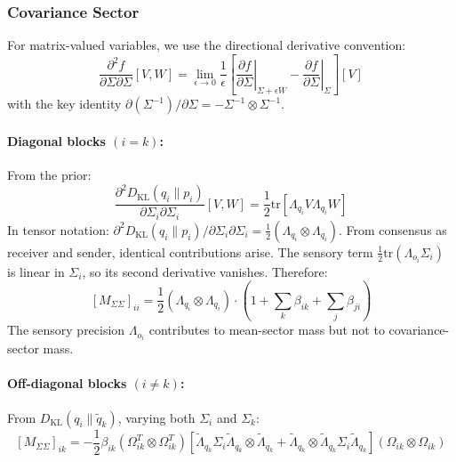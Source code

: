 \documentclass[11pt]{article}
\begin{document}
\subsubsection{Covariance Sector}

For matrix-valued variables, we use the directional derivative convention:
\begin{equation}
\frac{\partial^2 f}{\partial \Sigma \partial \Sigma}[V, W] = \lim_{\epsilon \to 0} \frac{1}{\epsilon}\left[\left.\frac{\partial f}{\partial \Sigma}\right|_{\Sigma + \epsilon W} - \left.\frac{\partial f}{\partial \Sigma}\right|_{\Sigma}\right][V]
\end{equation}
with the key identity $\partial(\Sigma^{-1})/\partial \Sigma = -\Sigma^{-1} \otimes \Sigma^{-1}$.

\paragraph{Diagonal blocks $(i = k)$:} From the prior:
\begin{equation}
\frac{\partial^2 D_{\mathrm{KL}}(q_i \| p_i)}{\partial \Sigma_i \partial \Sigma_i}[V, W] = \frac{1}{2}\mathrm{tr}[\Lambda_{q_i} V \Lambda_{q_i} W]
\end{equation}
In tensor notation: $\partial^2 D_{\mathrm{KL}}(q_i \| p_i)/\partial \Sigma_i \partial \Sigma_i = \frac{1}{2}(\Lambda_{q_i} \otimes \Lambda_{q_i})$. From consensus as receiver and sender, identical contributions arise. The sensory term $\frac{1}{2}\mathrm{tr}(\Lambda_{o_i}\Sigma_i)$ is linear in $\Sigma_i$, so its second derivative vanishes. Therefore:
\begin{equation}
\boxed{[M_{\Sigma\Sigma}]_{ii} = \frac{1}{2}(\Lambda_{q_i} \otimes \Lambda_{q_i}) \cdot \left(1 + \sum_k \beta_{ik} + \sum_j \beta_{ji}\right)}
\label{eq:mass_sigma_diagonal}
\end{equation}
The sensory precision $\Lambda_{o_i}$ contributes to mean-sector mass but not to covariance-sector mass.

\paragraph{Off-diagonal blocks $(i \neq k)$:} From $D_{\mathrm{KL}}(q_i \| \tilde{q}_k)$, varying both $\Sigma_i$ and $\Sigma_k$:
\begin{equation}
\boxed{[M_{\Sigma\Sigma}]_{ik} = -\frac{1}{2}\beta_{ik}(\Omega_{ik}^T \otimes \Omega_{ik}^T)\left[\tilde{\Lambda}_{q_k}\Sigma_i\tilde{\Lambda}_{q_k} \otimes \tilde{\Lambda}_{q_k} + \tilde{\Lambda}_{q_k} \otimes \tilde{\Lambda}_{q_k}\Sigma_i\tilde{\Lambda}_{q_k}\right](\Omega_{ik} \otimes \Omega_{ik})}
\label{eq:mass_sigma_offdiagonal}
\end{equation}
\end{document}
